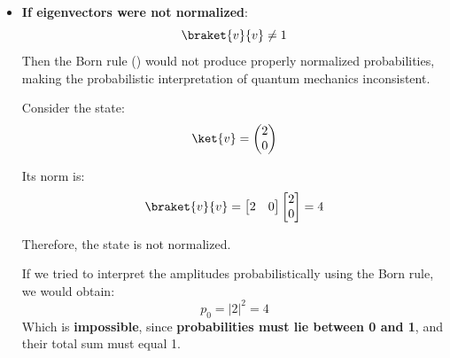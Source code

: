 \begin{enumerate}
\begin{itemize}
        \item[\textcolor{Red2}{\faIcon{times}}] \textbf{If eigenvectors were not normalized}:
        \begin{equation*}
            \braket{v}{v} \neq 1
        \end{equation*}
        Then the Born rule () would not produce properly normalized probabilities, making the probabilistic interpretation of quantum mechanics inconsistent.
        \begin{examplebox}
            Consider the state:
            \begin{equation*}
                \ket{v}
                =
                \begin{pmatrix}
                    2 \\
                    0
                \end{pmatrix}
            \end{equation*}

            Its norm is:
            \begin{equation*}
                \braket{v}{v}
                =
                \begin{bmatrix}
                    2 & 0
                \end{bmatrix}
                \begin{bmatrix}
                    2 \\
                    0
                \end{bmatrix}
                = 4
            \end{equation*}

            Therefore, the state is not normalized.

            \highspace
            If we tried to interpret the amplitudes probabilistically using the Born rule, we would obtain:
            \begin{equation*}
                p_0 = |2|^2 = 4
            \end{equation*}
            Which is \textbf{impossible}, since \textbf{probabilities must lie between 0 and 1}, and their total sum must equal 1.


\end{examplebox}
\end{itemize}
\end{enumerate}
